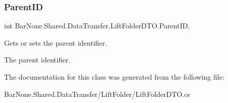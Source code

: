 \subsubsection{\texorpdfstring{Parent\+ID}{ParentID}}
{\footnotesize\ttfamily int Bar\+None.\+Shared.\+Data\+Transfer.\+Lift\+Folder\+D\+T\+O.\+Parent\+ID\hspace{0.3cm}{\ttfamily [get]}, {\ttfamily [set]}}



Gets or sets the parent identifier. 

The parent identifier. 

The documentation for this class was generated from the following file\+:\begin{DoxyCompactItemize}
\item 
Bar\+None.\+Shared.\+Data\+Transfer/\+Lift\+Folder/Lift\+Folder\+D\+T\+O.\+cs\end{DoxyCompactItemize}
